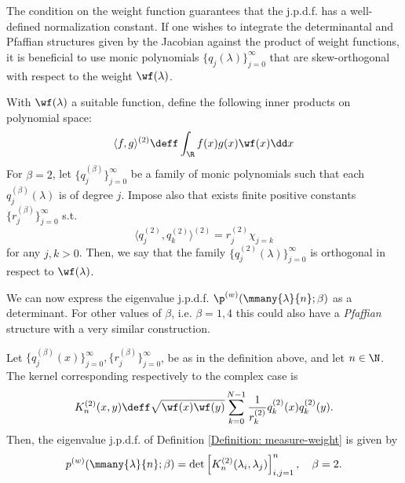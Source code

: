  The condition on the weight function guarantees that the j.p.d.f. has a well-defined normalization constant. If one wishes to integrate the determinantal and Pfaffian structures given by the Jacobian against the product of weight functions, it is beneficial to use monic polynomials $\{q_j(\lambda)\}_{j=0}^\infty$ that are skew-orthogonal with respect to the weight $\wf(\lambda)$.
 
 \begin{definicao}
 	With $\wf(\lambda)$ a suitable function, define the following inner products on polynomial space:
 	\begin{equation}
 		\langle f,g \rangle^{(2)} \deff \int_{\R} f(x) g(x) \wf(x) \dd x
 	\end{equation}
 	For $\beta = 2$, let $\{q_j^{(\beta)}\}_{j=0}^\infty$ be a family of monic polynomials such that each $q_j^{(\beta)}(\lambda)$ is of degree $j$. Impose also that exists finite positive constants $\{r_j^{(\beta)}\}_{j=0}^\infty$ s.t.
 	\begin{equation}
 		\langle q_j^{(2)}, q_k^{(2)} \rangle^{(2)} = r_j^{(2)} \chi_{j=k}
 	\end{equation}	
 	for any $j,k>0$. Then, we say that the family $\{q_j^{(2)}(\lambda)\}_{j=0}^\infty$ is orthogonal in respect to $\wf(\lambda)$.
 \end{definicao}
 
 We can now express the eigenvalue j.p.d.f. $\p^{(w)}(\mmany{\lambda}{n};\beta)$ as a determinant. For other values of $\beta$, i.e. $\beta = 1, 4$ this could also have a \textit{Pfaffian} structure with a very similar construction. 
 
 \begin{teorema}
 	Let $\{q_j^{(\beta)}(x)\}_{j=0}^{\infty}, \{r_j^{(\beta)}\}_{j=0}^{\infty}$, be as in the definition above, and let $n \in \N$. The kernel corresponding respectively to the complex case is
 	\begin{equation}
 		K_n^{(2)}(x,y) \deff \sqrt{\wf(x) \wf(y)} \sum_{k=0}^{N-1} \frac{1}{r_k^{(2)}} q_k^{(2)}(x) q_k^{(2)}(y).
 	\end{equation}
 	Then, the eigenvalue j.p.d.f. of Definition \ref{Definition: measure-weight} is given by
 	\begin{equation}
 		p^{(w)}(\mmany{\lambda}{n};\beta) = \det\left[ K_n^{(2)}(\lambda_i, \lambda_j) \right]_{i,j=1}^{n}, \quad \beta = 2.
 	\end{equation}
 	\label{Theorem: Kernel}
 \end{teorema}
 
